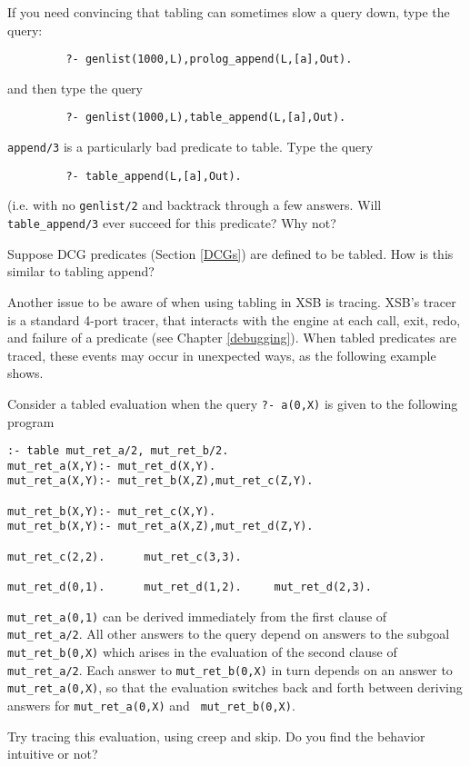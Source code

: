 \begin{exercise} \label{ex:append}
If you need convincing that tabling can sometimes slow a query down,
type the query:
\begin{verbatim}
         ?- genlist(1000,L),prolog_append(L,[a],Out).
\end{verbatim}
and then type the query
\begin{verbatim}
         ?- genlist(1000,L),table_append(L,[a],Out).
\end{verbatim}
{\tt append/3} is a particularly bad predicate to table.  Type the query
\begin{verbatim}
         ?- table_append(L,[a],Out).
\end{verbatim}
(i.e. with no {\tt genlist/2} and backtrack through a few answers.
Will {\tt table\_append/3} ever succeed for this predicate?  Why not?

Suppose DCG predicates (Section \ref{DCGs}) are defined to be tabled.
How is this similar to tabling append?
\end{exercise}

Another issue to be aware of when using tabling in XSB is tracing.
XSB's tracer is a standard 4-port tracer, that interacts with the
engine at each call, exit, redo, and failure of a predicate (see
Chapter \ref{debugging}).  When tabled predicates are traced, these
events may occur in unexpected ways, as the following example shows.

\begin{exercise} \label{ex:scc}

Consider a tabled evaluation when the query {\tt ?- a(0,X)} is given
to the following program
\begin{verbatim}
:- table mut_ret_a/2, mut_ret_b/2.
mut_ret_a(X,Y):- mut_ret_d(X,Y).
mut_ret_a(X,Y):- mut_ret_b(X,Z),mut_ret_c(Z,Y).

mut_ret_b(X,Y):- mut_ret_c(X,Y).
mut_ret_b(X,Y):- mut_ret_a(X,Z),mut_ret_d(Z,Y).

mut_ret_c(2,2).      mut_ret_c(3,3).

mut_ret_d(0,1).	     mut_ret_d(1,2).     mut_ret_d(2,3).
\end{verbatim}
{\tt mut\_ret\_a(0,1)} can be derived immediately from the first
clause of {\tt mut\_ret\_a/2}.  All other answers to the query depend
on answers to the subgoal {\tt mut\_ret\_b(0,X)} which arises in the
evaluation of the second clause of {\tt mut\_ret\_a/2}.  Each answer
to {\tt mut\_ret\_b(0,X)} in turn depends on an answer to {\tt
mut\_ret\_a(0,X)}, so that the evaluation switches back and forth
between deriving answers for {\tt mut\_ret\_a(0,X)} and {\tt
mut\_ret\_b(0,X)}.

Try tracing this evaluation, using creep and skip.  Do you find the
behavior intuitive or not?
\end{exercise}

